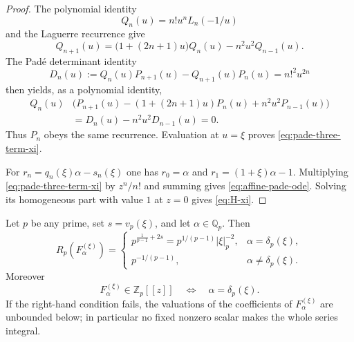 \begin{proof}
The polynomial identity
\[
 Q_n(u)=n!u^nL_n(-1/u)
\]
and the Laguerre recurrence give
\[
 Q_{n+1}(u)=\bigl(1+(2n+1)u\bigr)Q_n(u)-n^2u^2Q_{n-1}(u).
\]
The Pad\'e determinant identity
\begin{equation}
 D_n(u):=Q_n(u)P_{n+1}(u)-Q_{n+1}(u)P_n(u)=n!^2u^{2n}
\label{eq:pade-casoratian}
\end{equation}
then yields, as a polynomial identity,
\begin{align*}
 Q_n(u)&\bigl(P_{n+1}(u)-(1+(2n+1)u)P_n(u)
                    +n^2u^2P_{n-1}(u)\bigr)\\
 &=D_n(u)-n^2u^2D_{n-1}(u)=0.
\end{align*}
Thus $P_n$ obeys the same recurrence.  Evaluation at $u=\xi$ proves
\eqref{eq:pade-three-term-xi}.

For $r_n=q_n(\xi)\alpha-s_n(\xi)$ one has
$r_0=\alpha$ and $r_1=(1+\xi)\alpha-1$.  Multiplying
\eqref{eq:pade-three-term-xi} by $z^n/n!$ and summing gives
\eqref{eq:affine-pade-ode}.  Solving its homogeneous part with value $1$
at $z=0$ gives \eqref{eq:H-xi}.
\end{proof}

\begin{theorem}
\label{thm:all-prime-radius}
Let $p$ be any prime, set $s=v_p(\xi)$, and let $\alpha\in\mathbb Q_p$.
Then
\begin{equation}
 R_p\!\left(F_\alpha^{(\xi)}\right)=
 \begin{cases}
 p^{\frac1{p-1}+2s}
   =p^{1/(p-1)}|\xi|_p^{-2},&\alpha=\delta_p(\xi),\\[2mm]
 p^{-1/(p-1)},&\alpha\ne\delta_p(\xi).
 \end{cases}
\label{eq:all-prime-radius}
\end{equation}
Moreover
\begin{equation}
 F_\alpha^{(\xi)}\in\mathbb Z_p[[z]]
 \quad\Longleftrightarrow\quad
 \alpha=\delta_p(\xi).
\label{eq:integrality-matching}
\end{equation}
If the right-hand condition fails, the valuations of the coefficients of
$F_\alpha^{(\xi)}$ are unbounded below; in particular no fixed nonzero
scalar makes the whole series integral.
\end{theorem}

